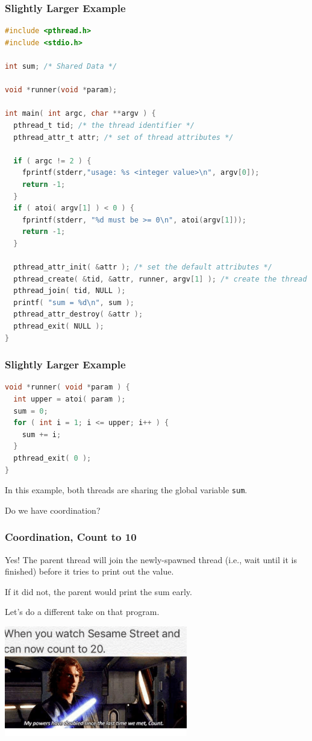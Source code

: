 \begin{frame}[fragile]
	\frametitle{Slightly Larger Example}

	\begin{lstlisting}[language=C]
#include <pthread.h>
#include <stdio.h>

int sum; /* Shared Data */

void *runner(void *param);

int main( int argc, char **argv ) {
  pthread_t tid; /* the thread identifier */
  pthread_attr_t attr; /* set of thread attributes */

  if ( argc != 2 ) {
    fprintf(stderr,"usage: %s <integer value>\n", argv[0]);
    return -1;
  }
  if ( atoi( argv[1] ) < 0 ) {
    fprintf(stderr, "%d must be >= 0\n", atoi(argv[1]));
    return -1;
  }

  pthread_attr_init( &attr ); /* set the default attributes */
  pthread_create( &tid, &attr, runner, argv[1] ); /* create the thread */
  pthread_join( tid, NULL );
  printf( "sum = %d\n", sum );
  pthread_attr_destroy( &attr );
  pthread_exit( NULL );
}
\end{lstlisting}


\end{frame}

\begin{frame}[fragile]
	\frametitle{Slightly Larger Example}


	\begin{lstlisting}[language=C]
void *runner( void *param ) {
  int upper = atoi( param );
  sum = 0;
  for ( int i = 1; i <= upper; i++ ) {
    sum += i;
  }
  pthread_exit( 0 );
}
\end{lstlisting}

	In this example, both threads are sharing the global variable \texttt{sum}.

	Do we have coordination?

\end{frame}


\begin{frame}
	\frametitle{Coordination, Count to 10}
	Yes! The parent thread will join the newly-spawned thread (i.e., wait until it is finished) before it tries to print out the value.

	If it did not, the parent would print the sum early.

	Let's do a different take on that program.

	\begin{center}
		\includegraphics[width=0.6\textwidth]{images/sesamestreet.png}
	\end{center}

\end{frame}

